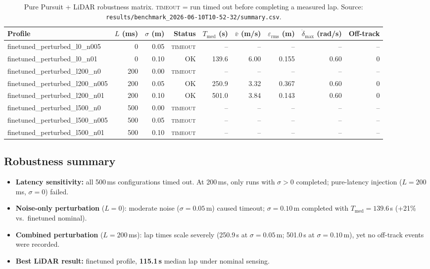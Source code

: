 \documentclass[11pt,a4paper]{article}
\newcommand{\runref}[1]{\texttt{results/#1}}
\newcommand{\best}[1]{\textbf{#1}}
\newcommand{\fail}{\textsc{timeout}}
\newcommand{\ndash}{--}
\begin{document}
\begin{table}[H]
  \centering
  \caption{Pure Pursuit + LiDAR robustness matrix.
           \fail{} = run timed out before completing a measured lap.
           Source: \runref{benchmark\_2026-06-10T10-52-32/summary.csv}.}
  \label{tab:lidar-sweep}
  \footnotesize
  \begin{tabular}{@{}lrrrrrrrr@{}}
    \toprule
    Profile & $L$ (ms) & $\sigma$ (m) &
    Status & $T_{\mathrm{med}}$ (s) & $\bar{v}$ (m/s) &
    $\varepsilon_{\mathrm{rms}}$ (m) & $\dot{\delta}_{\max}$ (rad/s) & Off-track \\
    \midrule
    finetuned\_perturbed\_l0\_n005   &   0 & 0.05 & \fail      & \ndash & \ndash & \ndash & \ndash & \ndash \\
    finetuned\_perturbed\_l0\_n01    &   0 & 0.10 & OK         & 139.6 & 6.00 & 0.155 & 0.60 & 0 \\
    finetuned\_perturbed\_l200\_n0   & 200 & 0.00 & \fail      & \ndash & \ndash & \ndash & \ndash & \ndash \\
    finetuned\_perturbed\_l200\_n005 & 200 & 0.05 & OK         & 250.9 & 3.32 & 0.367 & 0.60 & 0 \\
    finetuned\_perturbed\_l200\_n01  & 200 & 0.10 & OK         & 501.0 & 3.84 & 0.143 & 0.60 & 0 \\
    finetuned\_perturbed\_l500\_n0   & 500 & 0.00 & \fail      & \ndash & \ndash & \ndash & \ndash & \ndash \\
    finetuned\_perturbed\_l500\_n005 & 500 & 0.05 & \fail      & \ndash & \ndash & \ndash & \ndash & \ndash \\
    finetuned\_perturbed\_l500\_n01  & 500 & 0.10 & \fail      & \ndash & \ndash & \ndash & \ndash & \ndash \\
    \bottomrule
  \end{tabular}
\end{table}

\subsection{Robustness summary}
\begin{itemize}[nosep]
  \item \textbf{Latency sensitivity:} all 500\,ms configurations timed out.
        At 200\,ms, only runs with $\sigma > 0$ completed; pure-latency
        injection ($L{=}200$\,ms, $\sigma{=}0$) failed.
  \item \textbf{Noise-only perturbation} ($L{=}0$): moderate noise ($\sigma{=}0.05$\,m)
        caused timeout; $\sigma{=}0.10$\,m completed with
        $T_{\mathrm{med}} = 139.6$\,s (+21\% vs.\ finetuned nominal).
  \item \textbf{Combined perturbation} ($L{=}200$\,ms): lap times scale severely
        (250.9\,s at $\sigma{=}0.05$\,m;
        501.0\,s at $\sigma{=}0.10$\,m), yet no off-track events were recorded.
  \item \textbf{Best LiDAR result:} finetuned profile,
        \best{115.1\,s} median lap under nominal sensing.
\end{itemize}
\end{document}
